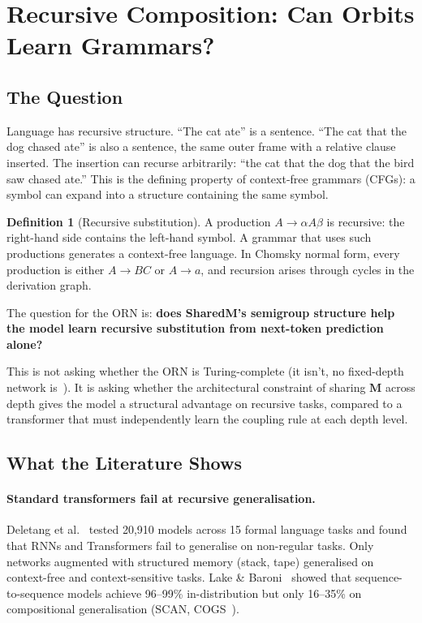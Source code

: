 \documentclass[11pt, a4paper]{article}
\newcommand{\M}{\mathbf{M}}
\theoremstyle{plain}
\theoremstyle{definition}
\newtheorem{definition}{Definition}
\theoremstyle{remark}
\begin{document}
\section{Recursive Composition: Can Orbits Learn Grammars?}
\label{sec:recursive}

\subsection{The Question}

Language has recursive structure.
``The cat ate'' is a sentence.
``The cat that the dog chased ate'' is also a sentence, the same outer frame with a relative clause inserted.
The insertion can recurse arbitrarily: ``the cat that the dog that the bird saw chased ate.''
This is the defining property of context-free grammars (CFGs): a symbol can expand into a structure containing the same symbol.

\begin{definition}[Recursive substitution]
A production $A \to \alpha A \beta$ is recursive: the right-hand side contains the left-hand symbol.
A grammar that uses such productions generates a context-free language.
In Chomsky normal form, every production is either $A \to BC$ or $A \to a$, and recursion arises through cycles in the derivation graph.
\end{definition}

The question for the ORN is: \textbf{does SharedM's semigroup structure help the model learn recursive substitution from next-token prediction alone?}

This is not asking whether the ORN is Turing-complete (it isn't, no fixed-depth network is~\cite{perez2019turing}).
It is asking whether the architectural constraint of sharing $\M$ across depth gives the model a structural advantage on recursive tasks, compared to a transformer that must independently learn the coupling rule at each depth level.

\subsection{What the Literature Shows}

\paragraph{Standard transformers fail at recursive generalisation.}
Deletang et al.~\cite{deletang2023chomsky} tested 20,910 models across 15 formal language tasks and found that RNNs and Transformers fail to generalise on non-regular tasks.
Only networks augmented with structured memory (stack, tape) generalised on context-free and context-sensitive tasks.
Lake \& Baroni~\cite{lake2018scan} showed that sequence-to-sequence models achieve 96--99\% in-distribution but only 16--35\% on compositional generalisation (SCAN, COGS~\cite{kim2020cogs}).
\end{document}
